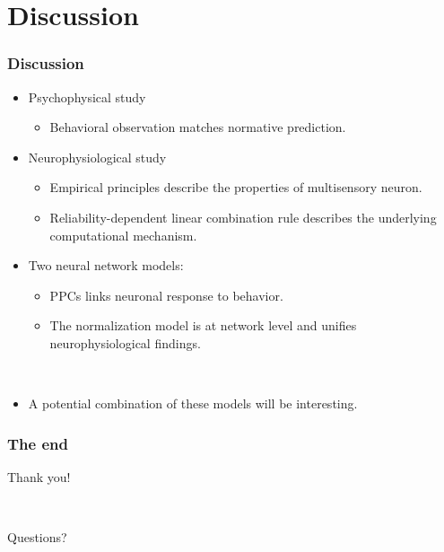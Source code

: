 \documentclass{beamer}
\begin{document}
\section{Discussion}
\begin{frame}
  \frametitle{Discussion}
  \begin{itemize}
    \item Psychophysical study
    \begin{itemize}
      \item Behavioral observation matches normative prediction.
    \end{itemize}
    \item Neurophysiological study
    \begin{itemize}
      \item Empirical principles describe the properties of multisensory neuron.
      \item Reliability-dependent linear combination rule describes the underlying computational mechanism.
    \end{itemize}
    \item Two neural network models:
    \begin{itemize}
      \item PPCs links neuronal response to behavior.
      \item The normalization model is at network level and unifies neurophysiological findings.
    \end{itemize}

    ~
    \item A potential combination of these models will be interesting.
  \end{itemize}
\end{frame}

\begin{frame}
  \frametitle{The end}
  \begin{center}
    \Huge{Thank you!}

    ~

    \Huge{Questions?}
  \end{center}
\end{frame}
\end{document}
